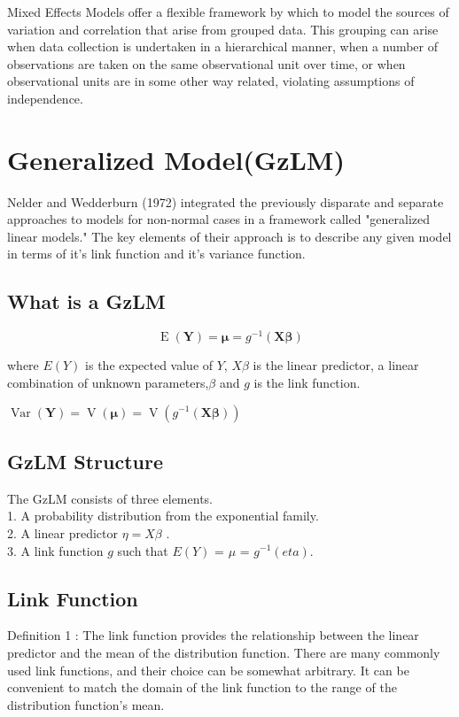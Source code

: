 \documentclass[12pt, a4paper]{report}
\theoremstyle{plain}
\theoremstyle{definition}
\theoremstyle{remark}
\begin{document}
	
	Mixed Effects Models offer a flexible framework by which to model
	the sources of variation and correlation that arise from grouped
	data. This grouping can arise when data collection is undertaken
	in a hierarchical manner, when a number of observations are taken
	on the same observational unit over time, or when observational
	units are in some other way related, violating assumptions of
	independence.
	
	\section{Generalized  Model(GzLM)}
	
	Nelder and Wedderburn (1972) integrated the previously disparate
	and separate approaches to models for non-normal cases in a
	framework called "generalized linear models."  The key elements of
	their approach is to describe any given model in terms of it's
	link function and it's variance function.
	
	\subsection{What is a GzLM}
	
	\begin{equation}
	\operatorname{E}(\mathbf{Y}) = \boldsymbol{\mu} =
	g^{-1}(\mathbf{X}\boldsymbol{\beta})
	\end{equation}
	
	where $E(Y)$ is the expected value of $Y$, $X\beta$ is the linear
	predictor, a linear combination of unknown parameters,$\beta$ and
	$g$ is the link function.
	
	
	$\operatorname{Var}(\mathbf{Y}) = \operatorname{V}(
	\boldsymbol{\mu} ) =
	\operatorname{V}(g^{-1}(\mathbf{X}\boldsymbol{\beta}))$
	\\
	
	
	\subsection{GzLM Structure}
	The GzLM consists of three elements. \\1. A probability
	distribution from the exponential family. \\2. A linear predictor
	$\eta= X\beta$ . \\3. A link function $g$ such that $E(Y)$ = $\mu$
	= $g^{-1}(eta)$.
	
	\subsection{Link Function}
	Definition 1 : The link function provides the relationship between
	the linear predictor and the mean of the distribution function.
	There are many commonly used link functions, and their choice can
	be somewhat arbitrary. It can be convenient to match the domain of
	the link function to the range of the distribution function's
	mean.
	
\end{document}
